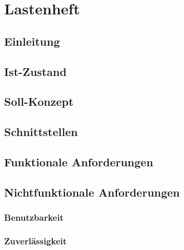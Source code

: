 \documentclass[a4paper,12pt]{article}
\title{\projektName}
\author{\authorName}
\date{\today}
\begin{document}
    
    \setcounter{page}{2}
    \setcounter{tocdepth}{4}
    \setcounter{secnumdepth}{4}
    \tableofcontents
    \clearpage
 
	\begin{abstract}
		Abstrakte Beschreibung.
	\end{abstract}	
	\clearpage
 
	\section{Lastenheft}
 	
		\subsection{Einleitung}
 		
 		
		\subsection{Ist-Zustand}
 		
 		
		\subsection{Soll-Konzept}
 		
 		
		\subsection{Schnittstellen}
 		
 		
		\subsection{Funktionale Anforderungen}
 		
 		
		\subsection{Nichtfunktionale Anforderungen}
            \subsubsection{Benutzbarkeit}
            
            
            \subsubsection{Zuverlässigkeit}
            
            
\end{document}
